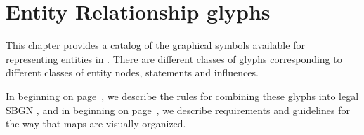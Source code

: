 
\chapter{Entity Relationship glyphs}
\label{chp:glyph}

This chapter provides a catalog of the graphical symbols available for representing entities in \ERms.  There are different classes of glyphs corresponding to different classes of entity nodes, statements and influences.

In  beginning on page~\pageref{chp:grammar}, we describe the rules for combining these glyphs into legal SBGN \ERs, and in  beginning on page~\pageref{chp:layout}, we describe requirements and guidelines for the way that maps are visually organized.









